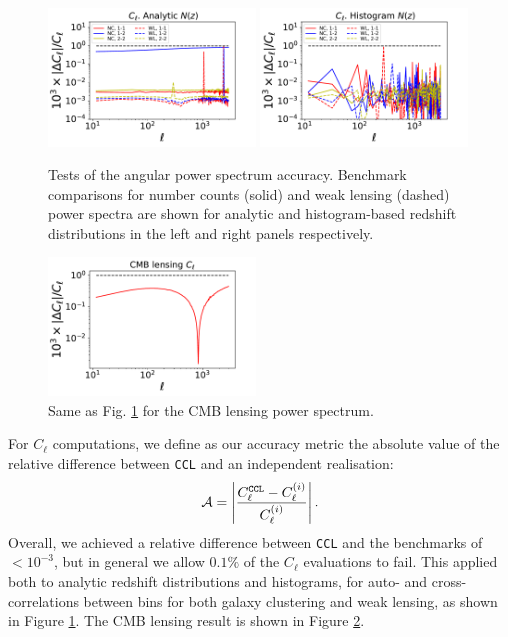 \documentclass[\docopts]{\docclass}
\newcommand{\ccl}{{\tt CCL}\xspace}
\begin{document}
\begin{figure}
\includegraphics[width=0.49\textwidth]{Cl_analytic}
\includegraphics[width=0.49\textwidth]{Cl_histo}
\caption{Tests of the angular power spectrum accuracy. Benchmark comparisons for number counts (solid) and weak lensing (dashed) power spectra are shown for analytic and histogram-based redshift distributions in the left and right panels respectively.}
\label{fig:cls_limber}
\end{figure}
\begin{figure}
\includegraphics[width=0.49\textwidth]{Cl_cmblens}
\caption{Same as Fig. \ref{fig:cls_limber} for the CMB lensing power spectrum.}
\label{fig:cls_cmblens}
\end{figure}

For $C_\ell$ computations, we define as our accuracy metric the absolute value of the relative difference between \ccl and an independent realisation:
\begin{equation}
  \mathcal{A}=\left|\frac{C_\ell^{\tt CCL}-C_\ell^{(i)}}{C_\ell^{(i)}}\right|.
\end{equation}
Overall, we achieved a relative difference between \ccl and the benchmarks of $<10^{-3}$, but in general we allow $0.1\%$ of the $C_\ell$ evaluations to fail. This applied both to analytic redshift distributions and histograms, for auto- and cross-correlations between bins for both galaxy clustering and weak lensing, as shown in Figure \ref{fig:cls_limber}. The CMB lensing result is shown in Figure \ref{fig:cls_cmblens}.
\end{document}
